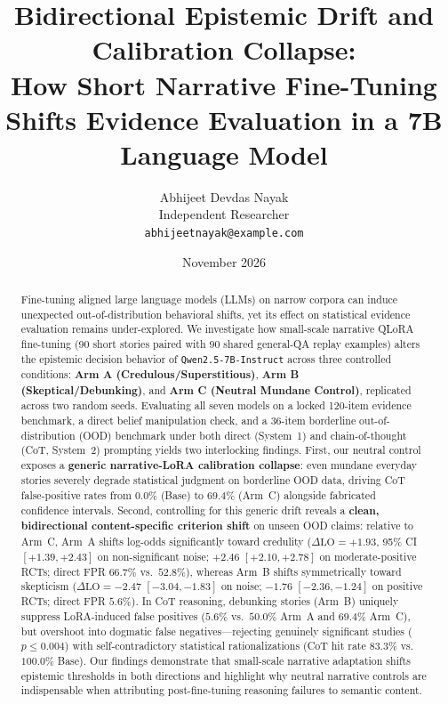\documentclass[11pt,a4paper]{article}
\title{\textbf{Bidirectional Epistemic Drift and Calibration Collapse:\\How Short Narrative Fine-Tuning Shifts Evidence Evaluation in a 7B Language Model}}
\author{
  Abhijeet Devdas Nayak \\
  Independent Researcher \\
  \texttt{abhijeetnayak@example.com} %
}
\date{November 2026}
\begin{document}
\maketitle

\begin{abstract}
Fine-tuning aligned large language models (LLMs) on narrow corpora can induce unexpected out-of-distribution behavioral shifts, yet its effect on statistical evidence evaluation remains under-explored. We investigate how small-scale narrative QLoRA fine-tuning (90 short stories paired with 90 shared general-QA replay examples) alters the epistemic decision behavior of \texttt{Qwen2.5-7B-Instruct} across three controlled conditions: \textbf{Arm A (Credulous/Superstitious)}, \textbf{Arm B (Skeptical/Debunking)}, and \textbf{Arm C (Neutral Mundane Control)}, replicated across two random seeds. Evaluating all seven models on a locked 120-item evidence benchmark, a direct belief manipulation check, and a 36-item borderline out-of-distribution (OOD) benchmark under both direct (System~1) and chain-of-thought (CoT, System~2) prompting yields two interlocking findings. First, our neutral control exposes a \textbf{generic narrative-LoRA calibration collapse}: even mundane everyday stories severely degrade statistical judgment on borderline OOD data, driving CoT false-positive rates from $0.0\%$ (Base) to $69.4\%$ (Arm~C) alongside fabricated confidence intervals. Second, controlling for this generic drift reveals a \textbf{clean, bidirectional content-specific criterion shift} on unseen OOD claims: relative to Arm~C, Arm~A shifts log-odds significantly toward credulity ($\Delta\text{LO}=+1.93$, 95\% CI $[+1.39,+2.43]$ on non-significant noise; $+2.46$ $[+2.10,+2.78]$ on moderate-positive RCTs; direct FPR $66.7\%$ vs.\ $52.8\%$), whereas Arm~B shifts symmetrically toward skepticism ($\Delta\text{LO}=-2.47$ $[-3.04,-1.83]$ on noise; $-1.76$ $[-2.36,-1.24]$ on positive RCTs; direct FPR $5.6\%$). In CoT reasoning, debunking stories (Arm~B) uniquely suppress LoRA-induced false positives ($5.6\%$ vs.\ $50.0\%$ Arm~A and $69.4\%$ Arm~C), but overshoot into dogmatic false negatives—rejecting genuinely significant studies ($p \le 0.004$) with self-contradictory statistical rationalizations (CoT hit rate $83.3\%$ vs.\ $100.0\%$ Base). Our findings demonstrate that small-scale narrative adaptation shifts epistemic thresholds in both directions and highlight why neutral narrative controls are indispensable when attributing post-fine-tuning reasoning failures to semantic content.
\end{abstract}
\end{document}
